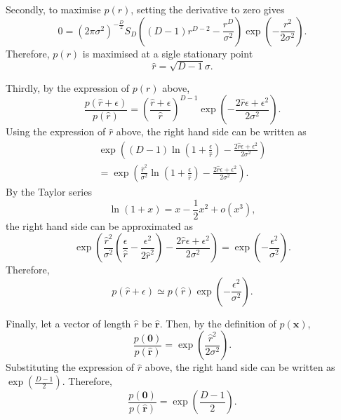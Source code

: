 Secondly, to maximise $p(r)$, setting the derivative to zero gives
%
\begin{equation}
0 = (2 \pi \sigma ^ 2) ^ {- \frac{D}{2}} S_D \left( (D - 1) r ^ {D - 2} - \frac{r ^ D}{\sigma ^ 2} \right) \exp \left( - \frac{r ^ 2}{2 \sigma ^2} \right).
\end{equation}
%
Therefore, $p(r)$ is maximised at a sigle stationary point
%
\begin{equation}
\hat{r} = \sqrt{D - 1} \sigma.
\end{equation}
%

Thirdly, by the expression of $p(r)$ above,
%
\begin{equation}
\frac{p \left( \hat{r} + \epsilon \right)}{p \left( \hat{r} \right)} = \left( \frac{\hat{r} + \epsilon}{\hat{r}} \right) ^ {D - 1} \exp \left( - \frac{2 \hat{r} \epsilon + \epsilon ^ 2}{2 \sigma ^ 2} \right).
\end{equation}
%
Using the expression of $\hat{r}$ above, the right hand side can be written as
%
\begin{equation}
\begin{aligned}
\exp \left( (D - 1) \ln \left( 1 + \frac{\epsilon}{\hat{r}} \right) - \frac{2 \hat{r} \epsilon + \epsilon ^ 2}{2 \sigma ^ 2} \right) \\
= \exp \left( \frac{\hat{r} ^ 2}{\sigma ^ 2} \ln \left( 1 + \frac{\epsilon}{\hat{r}} \right) - \frac{2 \hat{r} \epsilon + \epsilon ^ 2}{2 \sigma ^ 2} \right).
\end{aligned}
\end{equation}
%
By the Taylor series
%
\begin{equation}
\ln (1 + x) = x - \frac{1}{2} x ^ 2 + o \left( x ^ 3 \right),
\end{equation}
%
the right hand side can be approximated as
%
\begin{equation}
\exp \left( \frac{\hat{r} ^ 2}{\sigma ^ 2} \left( \frac{\epsilon}{\hat{r}} - \frac{\epsilon ^ 2}{2 {\hat{r}} ^ 2} \right) - \frac{2 \hat{r} \epsilon + \epsilon ^ 2}{2 \sigma ^ 2} \right) = \exp \left( - \frac{\epsilon ^ 2}{\sigma ^ 2} \right).
\end{equation}
%
Therefore,
%
\begin{equation}
p \left( \hat{r} + \epsilon \right) \simeq p \left( \hat{r} \right) \exp \left( - \frac{\epsilon ^ 2}{\sigma ^ 2} \right).
\end{equation}
%

Finally, let a vector of length $\hat{r}$ be $\hat{\mathbf{r}}$.
Then, by the definition of $p(\mathbf{x})$,
%
\begin{equation}
\frac{p(\mathbf{0})}{p \left( \hat{\mathbf{r}} \right)} = \exp \left( \frac{\hat{r} ^ 2}{2 \sigma ^2} \right).
\end{equation}
%
Substituting the expression of $\hat{r}$ above, the right hand side can be written as $\exp \left( \frac{D - 1}{2} \right)$.
Therefore,
%
\begin{equation}
\frac{p(\mathbf{0})}{p \left( \hat{\mathbf{r}} \right)} = \exp \left( \frac{D - 1}{2} \right).
\end{equation}
%


